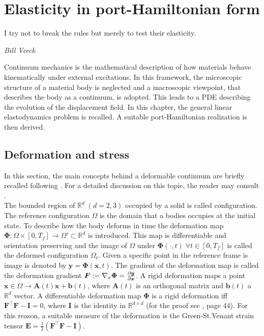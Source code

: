 \chapter{Elasticity in port-Hamiltonian form}

\epigraph{I try not to break the rules but merely to test their elasticity.}{\textit{Bill Veeck}}
\minitoc

Continuum mechanics is the mathematical description of how materials behave kinematically under external excitations. In this framework, the microscopic structure of a material body is neglected and a macroscopic viewpoint, that describes the body as a continuum, is adopted. This leads to a PDE describing the evolution of the displacement field. In this chapter, the general linear elastodynamics problem is recalled. A suitable port-Hamiltonian realization is then derived.

\section{Deformation and stress}
In this section, the main concepts behind a deformable continuum are briefly recalled following \cite{lee2012mixed}. For a detailed discussion on this topic, the reader may consult \cite{abeyaratne2012notes,landau2012elasticity}. \\

The bounded region of $\mathbb{R}^d \; (d=2, 3)$ occupied by a solid is called configuration. The reference configuration $\Omega$ is the domain that a bodies occupies at the initial state. To describe how the body deforms in time the deformation map $\bm\Phi: \Omega \times [0, T_f] \rightarrow \Omega' \subset \mathbb{R}^d$ is introduced. This map is differentiable and orientation preserving and the image of $\Omega$ under $\bm\Phi(\cdot, t) \; \forall t \in [0, T_f]$ is called the deformed configuration $\Omega_t$. Given a specific point in the reference frame is image is denoted by $\bm{y} = \bm{\Phi}(\bm{x}, t)$. The gradient of the deformation map is called the deformation gradient $\bm{F}:=\nabla_x\bm{\Phi} = \diffp{\bm{y}}{\bm{x}}$. A rigid deformation maps a point $\bm{x} \in \Omega \rightarrow \bm{A}(t) \bm{x} + \bm{b}(t)$, where $\bm{A}(t)$ is an orthogonal matrix and $\bm{b}(t)$ a $\mathbb{R}^d$ vector. A differentiable deformation map $\bm\Phi$ is a rigid deformation iff $\bm{F}^\top \bm{F} - \bm{I} = 0$,  where $\bm{I}$ is the identity in $\mathbb{R}^{d\times d}$ (for the proof see \cite{ciarlet1988mathematical}, page 44). For this reason, a suitable measure of the deformation is the Green-St.Venant strain tensor $\bm{E} = \frac{1}{2} (\bm{F}^\top \bm{F} - \bm{I})$.  \\

